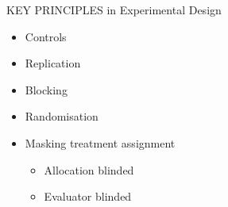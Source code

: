 \documentclass{beamer}
\begin{document}
\begin{frame}{KEY PRINCIPLES in Experimental Design}

\begin{alertblock}{}
 \begin{itemize}
  \item Controls
  \item Replication
  \item Blocking
  \item Randomisation
  \item {\color{red}{Blinding}} Masking treatment assignment
    \begin{itemize}
     \item Allocation blinded
     \item Evaluator blinded
    \end{itemize}
 \end{itemize}

\end{alertblock}

\end{frame}
\end{document}
